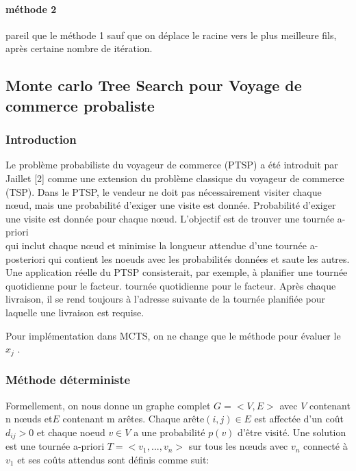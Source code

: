 \documentclass[]{article}
\let\oldparagraph\paragraph
\renewcommand{\paragraph}[1]{\oldparagraph{#1}\mbox{}}
\begin{document}
\hypertarget{muxe9thode-2}{%
\paragraph{méthode 2}\label{muxe9thode-2}}

pareil que le méthode 1 sauf que on déplace le racine vers le plus
meilleure fils, après certaine nombre de itération.

\hypertarget{monte-carlo-tree-search-pour-voyage-de-commerce-probaliste}{%
\subsection{Monte carlo Tree Search pour Voyage de commerce
probaliste}\label{monte-carlo-tree-search-pour-voyage-de-commerce-probaliste}}

\hypertarget{introduction-2}{%
\subsubsection{Introduction}\label{introduction-2}}

Le problème probabiliste du voyageur de commerce (PTSP) a été introduit
par Jaillet {[}2{]} comme une extension du problème classique du
voyageur de commerce (TSP). Dans le PTSP, le vendeur ne doit pas
nécessairement visiter chaque nœud, mais une probabilité d'exiger une
visite est donnée. Probabilité d'exiger une visite est donnée pour
chaque nœud. L'objectif est de trouver une tournée a-priori\\
qui inclut chaque nœud et minimise la longueur attendue d'une tournée
a-posteriori qui contient les noeuds avec les probabilités données et
saute les autres. Une application réelle du PTSP consisterait, par
exemple, à planifier une tournée quotidienne pour le facteur. tournée
quotidienne pour le facteur. Après chaque livraison, il se rend toujours
à l'adresse suivante de la tournée planifiée pour laquelle une livraison
est requise.

Pour implémentation dans MCTS, on ne change que le méthode pour évaluer
le \(x_j\) .

\hypertarget{muxe9thode-duxe9terministe}{%
\subsubsection{Méthode déterministe}\label{muxe9thode-duxe9terministe}}

Formellement, on nous donne un graphe complet \(G = <V, E>\) avec \(V\)
contenant n nœuds et\( E\) contenant m arêtes. Chaque
arête\( (i, j) \in E\) est affectée d'un coût \(d_{ij} > 0\) et chaque
noeud \(v \in V\) a une probabilité \( p(v)\) d'être visité. Une
solution est une tournée a-priori \(T = <v_1 , . . . , v_n >\) sur tous
les nœuds avec \(v_n\) connecté à \(v_1\) et ses coûts attendus sont
définis comme suit:
\end{document}
